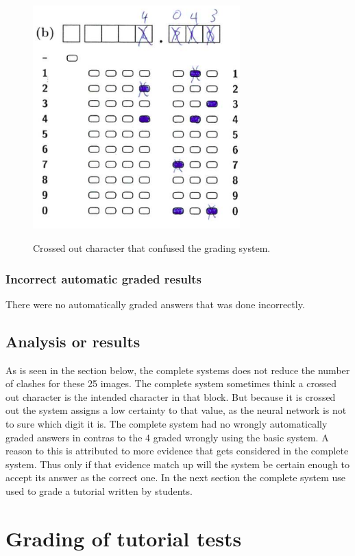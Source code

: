 \begin{figure}
  \centering
  \includegraphics[width=8cm]{crossedOutCharacter}\\
  \caption{Crossed out character that confused the grading system.}
  \label{fig:crossedOutCharacter}
\end{figure}

\subsubsection{Incorrect automatic graded results}

There were no automatically graded answers that was done incorrectly.

\subsection{Analysis or results}

As is seen in the section below, the complete systems does not reduce the number of clashes for these 25 images. The complete system sometimes think a crossed out character is the intended character in that block. But because it is crossed out the system assigns a low certainty to that value, as the neural network is not to sure which digit it is. The complete system had no wrongly automatically graded answers in contras to the 4 graded wrongly using the basic system. A reason to this is attributed to more evidence that gets considered in the complete system. Thus only if that evidence match up will the system be certain enough to accept its answer as the correct one. In the next section the complete system use used to grade a tutorial written by students. 

\section{Grading of tutorial tests}

